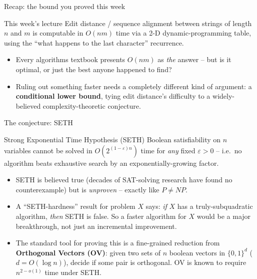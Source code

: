 \documentclass[11pt,aspectratio=169]{beamer}
\begin{document}
\begin{frame}{Recap: the bound you proved this week}
  \begin{block}{This week's lecture}
    Edit distance / sequence alignment between strings of length $n$ and $m$ is
    computable in $O(nm)$ time via a 2-D dynamic-programming table, using the
    ``what happens to the last character'' recurrence.
  \end{block}
  \begin{itemize}
    \item Every algorithms textbook presents $O(nm)$ as \emph{the} answer -- but is it
    optimal, or just the best anyone happened to find?
    \item Ruling out something faster needs a completely different kind of argument: a
    \textbf{conditional lower bound}, tying edit distance's difficulty to a
    widely-believed complexity-theoretic conjecture.
  \end{itemize}
\end{frame}

\begin{frame}{The conjecture: SETH}
  \begin{block}{Strong Exponential Time Hypothesis (SETH)}
    Boolean satisfiability on $n$ variables cannot be solved in
    $O(2^{(1-\varepsilon)n})$ time for \emph{any} fixed $\varepsilon > 0$ -- i.e.\ no
    algorithm beats exhaustive search by an exponentially-growing factor.
  \end{block}
  \begin{itemize}
    \item SETH is believed true (decades of SAT-solving research have found no
    counterexample) but is \emph{unproven} -- exactly like $P \ne NP$.
    \item A ``SETH-hardness'' result for problem $X$ says: \emph{if} $X$ has a
    truly-subquadratic algorithm, \emph{then} SETH is false. So a faster algorithm for
    $X$ would be a major breakthrough, not just an incremental improvement.
    \item The standard tool for proving this is a fine-grained reduction from
    \textbf{Orthogonal Vectors (OV)}: given two sets of $n$ boolean vectors in
    $\{0,1\}^{d}$ ($d = O(\log n)$), decide if some pair is orthogonal. OV is known to
    require $n^{2-o(1)}$ time under SETH.
  \end{itemize}
\end{frame}
\end{document}

